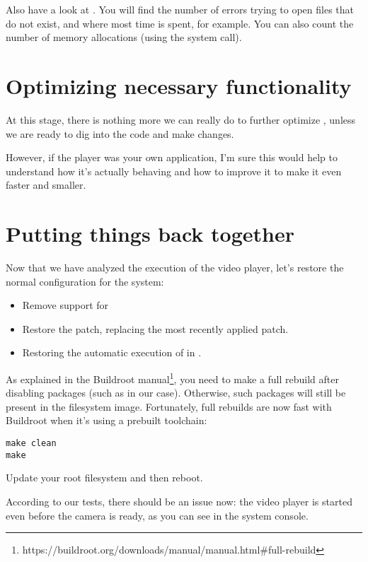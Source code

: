 Also have a look at . You will find the number
of errors trying to open files that do not exist, and where most time is
spent, for example. You can also count the number of memory allocations
(using the  system call).

\section{Optimizing necessary functionality}

At this stage, there is nothing more we can really do to further
optimize , unless we are ready to dig into the code and
make changes.

However, if the player was your own application, I'm sure this would
help to understand how it's actually behaving and how to improve it to
make it even faster and smaller.

\section{Putting things back together}

Now that we have analyzed the execution of the video player, let's
restore the normal configuration for the system:

\begin{itemize}
\item Remove support for 
\item Restore the
       patch,
      replacing the most recently applied patch.
\item Restoring the automatic execution of  in
      .
\end{itemize}


As explained in the Buildroot
manual\footnote{https://buildroot.org/downloads/manual/manual.html\#full-rebuild},
you need to make a full rebuild after disabling packages (such as
 in our case). Otherwise, such packages will still be present in the
filesystem image. Fortunately, full rebuilds are now fast with Buildroot
when it's using a prebuilt toolchain:

\begin{verbatim}
make clean
make
\end{verbatim}

Update your root filesystem and then reboot.

According to our tests, there should be an issue now: the video player
is started even before the camera is ready, as you can see in the system
console.


